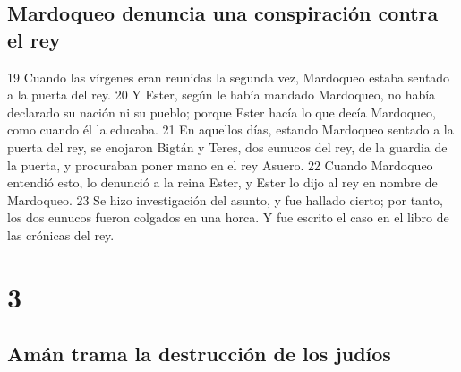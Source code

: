 \section*{Mardoqueo denuncia una conspiración contra el rey}

19 Cuando las vírgenes eran reunidas la segunda vez, Mardoqueo estaba sentado a la puerta del rey.
20 Y Ester, según le había mandado Mardoqueo, no había declarado su nación ni su pueblo; porque Ester hacía lo que decía Mardoqueo, como cuando él la educaba.
21 En aquellos días, estando Mardoqueo sentado a la puerta del rey, se enojaron Bigtán y Teres, dos eunucos del rey, de la guardia de la puerta, y procuraban poner mano en el rey Asuero.
22 Cuando Mardoqueo entendió esto, lo denunció a la reina Ester, y Ester lo dijo al rey en nombre de Mardoqueo.
23 Se hizo investigación del asunto, y fue hallado cierto; por tanto, los dos eunucos fueron colgados en una horca. Y fue escrito el caso en el libro de las crónicas del rey.

\chapter{3}

\section*{Amán trama la destrucción de los judíos}


